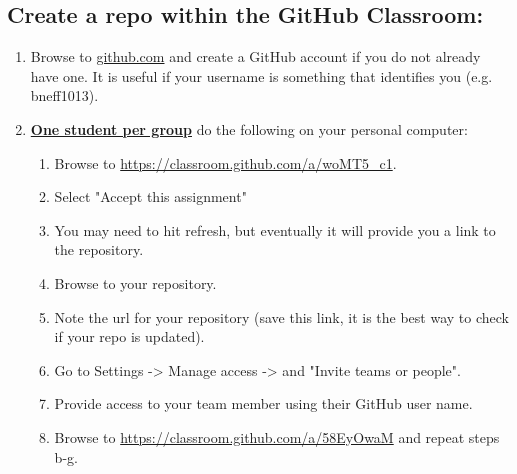 \documentclass{handout}
\begin{document}
\subsection{Create a repo within the GitHub Classroom:}
\begin{enumerate}
	\item Browse to \url{github.com} and create a GitHub account if you do not already have one. It is useful if your username is something that identifies you (e.g. bneff1013).
	\item \textbf{\underline{One student per group}} do the following on your personal computer: 
	\begin{enumerate}

	\item Browse to \url{https://classroom.github.com/a/woMT5_c1}.
	\item Select "Accept this assignment"
	\item You may need to hit refresh, but eventually it will provide you a link to the repository.
	\item Browse to your repository.
	\item Note the url for your repository (save this link, it is the best way to check if your repo is updated).
	\item Go to Settings -> Manage access -> and "Invite teams or people".
	\item Provide access to your team member using their GitHub user name.
	\item Browse to \url{https://classroom.github.com/a/58EyOwaM} and repeat steps b-g.
		\end{enumerate}
\end{enumerate}
\end{document}

